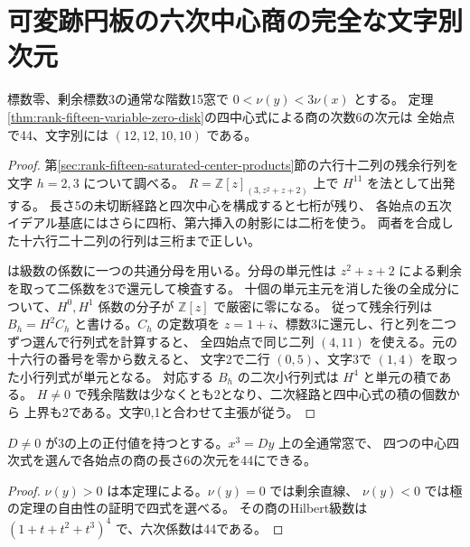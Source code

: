 \section{可変跡円板の六次中心商の完全な文字別次元}
\label{sec:rank-fifteen-sixth-center-minors}
\begin{theorem}\label{thm:rank-fifteen-sixth-center-minors}
標数零、剰余標数3の通常な階数15窓で $0<\nu(y)<3\nu(x)$ とする。
定理\ref{thm:rank-fifteen-variable-zero-disk}の四中心式による商の次数6の次元は
全始点で44、文字別には $(12,12,10,10)$ である。
\end{theorem}
\begin{proof}
第\ref{sec:rank-fifteen-saturated-center-products}節の六行十二列の残余行列を
文字 $h=2,3$ について調べる。
$R=\mathbb Z[z]_{(3,z^2+z+2)}$ 上で $H^{11}$ を法として出発する。
長さ5の未切断経路と四次中心を構成すると七桁が残り、
各始点の五次イデアル基底にはさらに四桁、第六挿入の射影には二桁を使う。
両者を合成した十六行二十二列の行列は三桁まで正しい。

は級数の係数に一つの共通分母を用いる。分母の単元性は
$z^2+z+2$ による剰余を取って二係数を3で還元して検査する。
十個の単元主元を消した後の全成分について、$H^0,H^1$ 係数の分子が
$\mathbb Z[z]$ で厳密に零になる。
従って残余行列は $B_h=H^2 C_h$ と書ける。$C_h$ の定数項を
$z=1+i$、標数3に還元し、行と列を二つずつ選んで行列式を計算すると、
全四始点で同じ二列 $(4,11)$ を使える。元の十六行の番号を零から数えると、
文字2で二行 $(0,5)$、文字3で $(1,4)$ を取った小行列式が単元となる。
対応する $B_h$ の二次小行列式は $H^4$ と単元の積である。
$H\ne0$ で残余階数は少なくとも2となり、二次経路と四中心式の積の個数から
上界も2である。文字0,1と合わせて主張が従う。
\end{proof}
\begin{corollary}
$D\ne0$ が3の上の正付値を持つとする。$x^3=Dy$ 上の全通常窓で、
四つの中心四次式を選んで各始点の商の長さ6の次元を44にできる。
\end{corollary}
\begin{proof}
$\nu(y)>0$ は本定理による。$\nu(y)=0$ では剰余直線、
$\nu(y)<0$ では極の定理の自由性の証明で四式を選べる。
その商のHilbert級数は $(1+t+t^2+t^3)^4$ で、六次係数は44である。
\end{proof}
